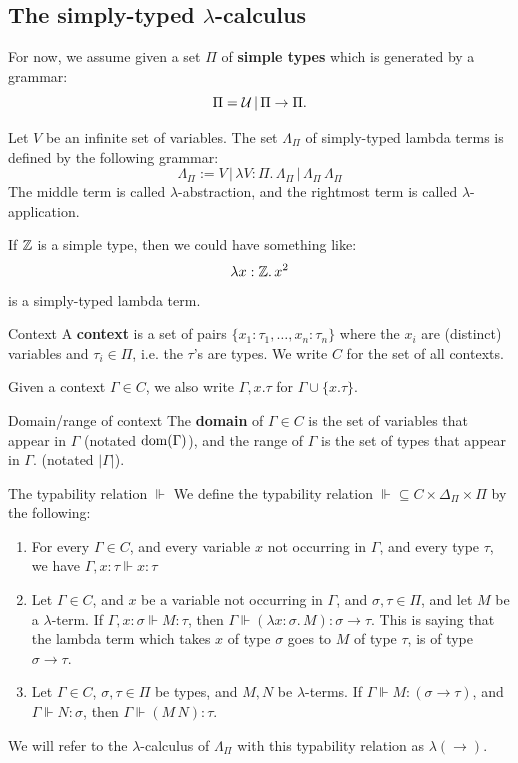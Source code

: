 \documentclass{article}
\numberwithin{thm}{subsection}
\begin{document}
\subsection{The simply-typed $\lambda$-calculus}
For now, we assume given a set $\Pi$ of \textbf{simple types} which is generated by a grammar: \[ \Pi = \mathcal{U} \, | \, \Pi \rightarrow \Pi. \]
\begin{fancydefine}{}
    Let $V$ be an infinite set of variables. The set $\Lambda_{\Pi}$ of simply-typed lambda terms is defined by the following grammar: \[ \Lambda_{\Pi} := V \, | \, \lambda V : \Pi. \, \Lambda_{\Pi} \, | \, \Lambda_{\Pi} \, \Lambda_{\Pi} \] 
    The middle term is called $\lambda$-abstraction, and the rightmost term is called $\lambda$-application.   
\end{fancydefine}
\begin{ex*}
    If $\mathbb{Z}$ is a simple type, then we could have something like: \[ \lambda x : \mathbb{Z}.\, x^{2}\] is a simply-typed lambda term.
\end{ex*}
\begin{fancydefine*}{Context}
    A \textbf{context} is a set of pairs $\{x_{1}:\tau_{1}, \dots, x_{n} : \tau_{n}\}$ where the $x_{i}$ are (distinct) variables and $\tau_{i} \in \Pi$, i.e. the $\tau$'s are types. We write $C$ for the set of all contexts.
\end{fancydefine*}
Given a context $\Gamma \in C$, we also write $\Gamma, x.\tau$ for $\Gamma \cup \{x.\tau\}$.
\begin{fancydefine*}{Domain/range of context}
    The \textbf{domain} of $\Gamma \in C$ is the set of variables that appear in $\Gamma$ (notated $\operatorname{dom}(\Gamma)$), and the range of $\Gamma$ is the set of types that appear in $\Gamma$. (notated $|\Gamma|$).
\end{fancydefine*}
\begin{fancydefine}{The typability relation $\Vdash$}
    We define the typability relation $\Vdash \subseteq C \times \Delta_{\Pi} \times \Pi$ by the following: \begin{enumerate}
        \item For every $\Gamma \in C$, and every variable $x$ not occurring in $\Gamma$, and every type $\tau$, we have $\Gamma, x: \tau \Vdash x:\tau$
        \item Let $\Gamma \in C$, and $x$ be a variable not occurring in $\Gamma$, and $\sigma, \tau \in \Pi$, and let $M$ be a $\lambda$-term. If $\Gamma, x : \sigma \Vdash M : \tau$, then $\Gamma \Vdash (\lambda x : \sigma.\, M) : \sigma \to \tau$. This is saying that the lambda term which takes $x$ of type $\sigma$ goes to $M$ of type $\tau$, is of type $\sigma \to \tau$.
        \item Let $\Gamma \in C$, $\sigma,\tau \in \Pi$ be types, and $M,N$ be $\lambda$-terms. If $\Gamma \Vdash M:(\sigma \to \tau)$, and $\Gamma \Vdash N : \sigma$, then $\Gamma \Vdash (M\,N): \tau$.
    \end{enumerate}
    We will refer to the $\lambda$-calculus of $\Lambda_{\Pi}$ with this typability relation as $\lambda(\to)$.
\end{fancydefine}
\end{document}

